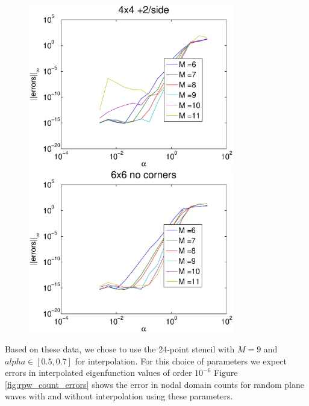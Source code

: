 \documentclass{report}
\begin{document}
\begin{figure}
  \begin{center}
    \includegraphics[width=0.8\textwidth]{figs/interpolation/error_norms_3.eps}
    \linebreak
    \includegraphics[width=0.8\textwidth]{figs/interpolation/error_norms_4.eps}
  \end{center}
\end{figure}

Based on these data, we chose to use the 24-point stencil with $M=9$ and $alpha \in [0.5, 0.7]$ for interpolation. For this choice of parameters we expect errors in interpolated eigenfunction values of order $10^{-6}$
 Figure \ref{fig:rpw_count_errors} shows the error in nodal domain counts for random plane waves with and without interpolation using these parameters.
\end{document}
